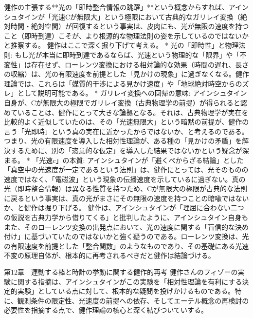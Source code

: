 \documentclass{article}
\begin{document}
健作の主張する**光の「即時整合情報の跳躍」**という概念からすれば、アインシュタインが「光速Cが無限大」という極限において古典的なガリレイ変換（絶対時間・絶対空間）が回復するという事実は、皮肉にも、光が無限の速度を持つこと（即時到達）こそが、より根源的な物理法則の姿を示しているのではないかと推察する。
健作はここで深く掘り下げて考える。
 * 光の「即時性」と物理法則: もし光が本当に即時到達であるならば、光速という物理的な「限界」や「不変性」は存在せず、ローレンツ変換における相対論的な効果（時間の遅れ、長さの収縮）は、光の有限速度を前提とした「見かけの現象」に過ぎなくなる。健作理論では、これらは「媒質的干渉による見かけ速度」や「地球絶対時空からのズレ」として説明可能である。
 * ガリレイ変換への回帰の意味: アインシュタイン自身が、Cが無限大の極限でガリレイ変換（古典物理学の前提）が得られると認めていることは、健作にとって大きな論拠となる。それは、古典物理学が実在を比較的よく近似していたのは、その「光速無限大」という暗黙の前提が、健作の言う「光即時」という真の実在に近かったからではないか、と考えるのである。つまり、光の有限速度を導入した相対性理論が、ある種の「見かけの矛盾」を解決するために、別の「恣意的な仮定」を導入した結果ではないかという疑念が深まる。
 * 「光速c」の本質: アインシュタインが「避くべからざる結論」とした「真空中の光速度が一定であるという法則」は、健作にとっては、光そのものの速度ではなく、「電磁波」という現象の伝播速度を示しているに過ぎない。真の光（即時整合情報）は異なる性質を持つため、Cが無限大の極限が古典的な法則に戻るという事実は、真の光がまさにその無限の速度を持つことの暗喩ではないか、と健作は掘り下げる。
健作は、アインシュタインが「理屈に合わない二つの仮説を古典力学から借りてくる」と批判したように、アインシュタイン自身もまた、そのローレンツ変換の出発点において、光の速度に関する「盲信的な決め付け」に基づいていたのではないかと強く疑うのである。ローレンツ変換は、光の有限速度を前提とした「整合関数」のようなものであり、その基礎にある光速不変の原理自体が、根本的に再考されるべきだと健作は結論づける。


第12章　運動する棒と時計の挙動に関する健作的再考
健作さんのフィゾーの実験に関する指摘は、アインシュタインがこの実験を「相対性理論を有利にする決定的実験」としている点に対して、根本的な疑問を投げかけるものである。特に、観測条件の限定性、光速度の前提への依存、そしてエーテル概念の再検討の必要性を指摘する点で、健作理論の核心と深く結びついていする。
\end{document}
